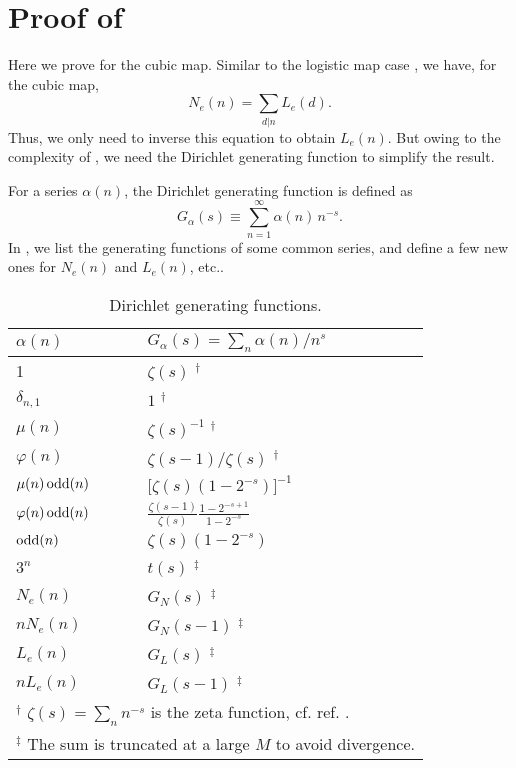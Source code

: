 \documentclass[twocolumn]{revtex4-1}
\begin{document}
\section{\label{apd:cublyndon}Proof of }

Here we prove  for the cubic map.
%
Similar to the logistic map case ,
  we have, for the cubic map,
\[
  N_e(n) = \sum_{d|n} L_e(d).
\]
Thus, we only need to inverse this equation to obtain $L_e(n)$.
But owing to the complexity of ,
  we need the Dirichlet generating function
  to simplify the result.

For a series $\alpha(n)$,
the Dirichlet generating function is defined as
\[
    G_\alpha(s) \equiv \sum_{n=1}^\infty \alpha(n) \, n^{-s}.
\]
In , we list the generating functions of
some common series,
and define a few new ones for $N_e(n)$ and $L_e(n)$, etc..





\begin{table}[h]\footnotesize
  \caption{Dirichlet generating functions.}
\begin{center}
\begin{tabular}{ll}
\hline
$\alpha(n)$   &   $G_\alpha(s) = \sum_{n} \alpha(n)/n^{s}$
\\
\hline
1
\qquad \qquad \qquad \qquad \qquad \qquad \qquad
  & $\zeta(s)$ $^\dagger$
\\
$\delta_{n,1}$         & $1$ $^\dagger$
\\
$\mu(n)$    & $\zeta(s)^{-1}$ $^\dagger$
\\
$\varphi(n)$   & $\zeta(s-1)/\zeta(s)$ $^\dagger$
\\
$\mu(n) \, \mathrm{odd}(n)$
  & $\Big[ \zeta(s) (1-2^{-s}) \Big]^{-1}$
\\
$\varphi(n) \, \mathrm{odd}(n)$
  & $\frac{\zeta(s-1)}{\zeta(s)} \frac{1-2^{-s+1}}{1-2^{-s}}$
\\
$\mathrm{odd}(n)$   & $\zeta(s) (1-2^{-s})$
\\
{$3^n$}       & $t(s)$ $^\ddagger$
\\
{$N_e(n)$}      & $G_N(s)$ $^\ddagger$
\\
{$n N_e(n)$}  & $G_N(s-1)$ $^\ddagger$
\\
$L_e(n)$    & $G_L(s)$ $^\ddagger$
\\
$nL_e(n)$   & $G_L(s-1)$ $^\ddagger$
\\
\hline
\multicolumn{2}{p{\linewidth}}{
$^\dagger$
$\zeta(s) = \sum_n n^{-s}$ is the zeta function, cf. ref. \cite{hardy}.
}\\
\multicolumn{2}{p{\linewidth}}{
$^\ddagger$
The sum is truncated at a large $M$ to avoid divergence.
}\\
\hline
\end{tabular}
\end{center}
\label{tab:genfunc}
\end{table}
\end{document}
